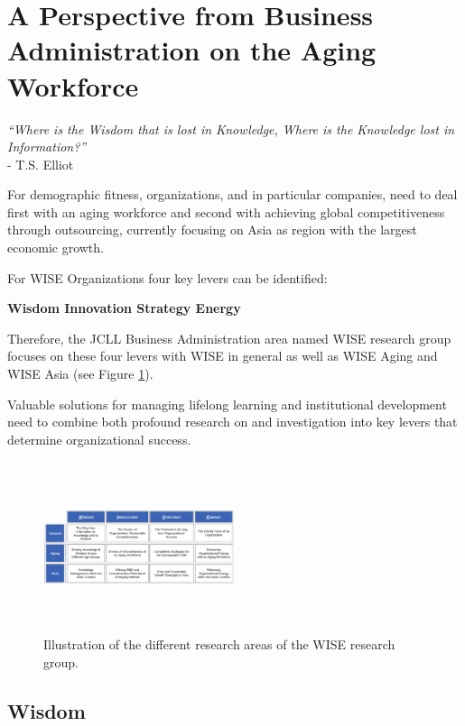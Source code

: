 \section{A Perspective from Business Administration on the Aging Workforce} 

\textit{``Where is the Wisdom that is lost in Knowledge, Where is the Knowledge lost in Information?''} \\- T.S. Elliot
 
 For demographic fitness, organizations, and in particular companies, need to deal first with an aging workforce and second with achieving global competitiveness through outsourcing, currently focusing on Asia as region with the largest economic growth. 

 For WISE Organizations four key levers can be identified: 

\begin{center} \textbf{Wisdom   Innovation   Strategy   Energy} \end{center}

 Therefore, the JCLL Business Administration area named WISE research group focuses on these four levers with WISE in general as well as WISE Aging and WISE Asia (see Figure \ref{fig1:profSvenVoelpel}).

 Valuable solutions for managing lifelong learning and institutional development need to combine both profound research on and investigation into key levers that determine organizational success.

\begin{figure}[htb]
  \begin{center}
    \includegraphics[width=0.5\textwidth,height=5cm]{profSvenVoelpel-fig1}
    \caption{Illustration of the different research areas of the WISE research group.}
    \label{fig1:profSvenVoelpel}
  \end{center}
\end{figure}

\newpage
\subsection{Wisdom}

